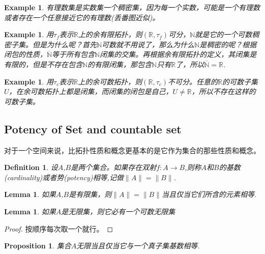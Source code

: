 \documentclass{article}
\newtheorem{lemma}[theorem]{Lemma}
\newtheorem{proposition}[theorem]{Proposition}
\newtheorem{example}[theorem]{Example}
\newtheorem{definition}[theorem]{Definition}
\newcommand*{\xfunc}[4]{{#2}\colon{#3}{#1}{#4}}
\newcommand*{\func}[3]{\xfunc{\to}{#1}{#2}{#3}}
\begin{document}
\begin{example}
有理数集是实数集一个稠密集，因为每一个实数，可能是一个有理数或者存在一个任意接近它的有理数(丢番图近似)。
\end{example}

\begin{example}
用$\tau_f$表示$\mathbb{R}$上的余有限拓扑，则$(\mathbb{R},\tau_f)$可分，$\mathbb{N}$就是它的一个可数稠密子集。但是为什么呢？首先$\mathbb{N}$可数就不用说了，那么为什么$\mathbb{N}$是稠密的呢？根据闭包的性质，$\overline{\mathbb{N}}$等于所有包含$\mathbb{N}$闭集的交集。再根据余有限拓扑的定义，其闭集是有限的，但是不存在包含$\mathbb{N}$的有限闭集，那包含$\mathbb{N}$只有$\mathbb{R}$了，所以$\overline{\mathbb{N}}=\mathbb{R}$.
\end{example}

\begin{example}
用$\tau_c$表示$\mathbb{R}$上的余可数拓扑，则$(\mathbb{R},\tau_c)$不可分。任意的$\mathbb{R}$的可数子集$U$，在余可数拓扑上都是闭集，而闭集的闭包是自己，$U \neq \mathbb{R}$，所以不存在这样的可数子集。
\end{example}

\subsection{Potency of Set and countable set}

对于一个空间来说，比拓扑性质和概念更基本的是它作为集合的那些性质和概念。

\begin{definition}
设$A$,$B$是两个集合。如果存在双射$\func{f}{A}{B}$,则称$A$和$B$的基数(cardinality)或者势(potency)相等,记做$\|A\|=\|B\|$.
\end{definition}

\begin{lemma}
如果$A$,$B$是有限集，则$\|A\|=\|B\|$当且仅当它们所含的元素相等.
\end{lemma}

\begin{lemma}
如果$A$是无限集，则它必有一个可数无限集
\end{lemma}

\begin{proof}
按顺序每次取一个就行。
\end{proof}

\begin{proposition}
集合$A$无限当且仅当它与一个真子集基数相等.
\end{proposition}
\end{document}
